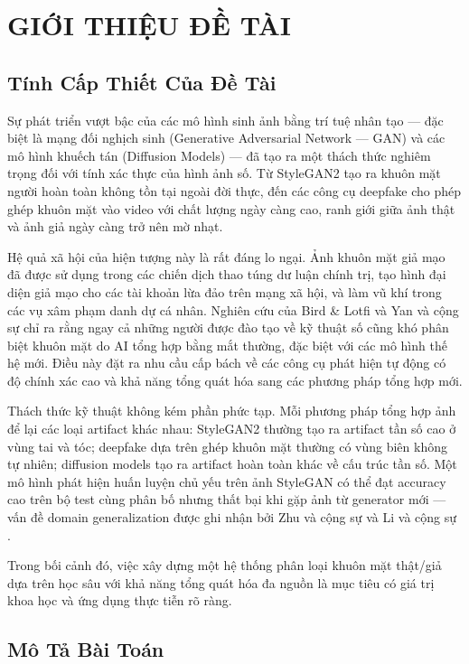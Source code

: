 \chapter{GIỚI THIỆU ĐỀ TÀI}

\section{Tính Cấp Thiết Của Đề Tài}

Sự phát triển vượt bậc của các mô hình sinh ảnh bằng trí tuệ nhân tạo --- đặc biệt là mạng đối nghịch sinh (Generative Adversarial Network --- GAN) và các mô hình khuếch tán (Diffusion Models) --- đã tạo ra một thách thức nghiêm trọng đối với tính xác thực của hình ảnh số. Từ StyleGAN2 \cite{karras2020stylegan2} tạo ra khuôn mặt người hoàn toàn không tồn tại ngoài đời thực, đến các công cụ deepfake cho phép ghép khuôn mặt vào video với chất lượng ngày càng cao, ranh giới giữa ảnh thật và ảnh giả ngày càng trở nên mờ nhạt.

Hệ quả xã hội của hiện tượng này là rất đáng lo ngại. Ảnh khuôn mặt giả mạo đã được sử dụng trong các chiến dịch thao túng dư luận chính trị, tạo hình đại diện giả mạo cho các tài khoản lừa đảo trên mạng xã hội, và làm vũ khí trong các vụ xâm phạm danh dự cá nhân. Nghiên cứu của Bird \& Lotfi \cite{bird2024cifake} và Yan và cộng sự \cite{yan2025aide} chỉ ra rằng ngay cả những người được đào tạo về kỹ thuật số cũng khó phân biệt khuôn mặt do AI tổng hợp bằng mắt thường, đặc biệt với các mô hình thế hệ mới. Điều này đặt ra nhu cầu cấp bách về các công cụ phát hiện tự động có độ chính xác cao và khả năng tổng quát hóa sang các phương pháp tổng hợp mới.

Thách thức kỹ thuật không kém phần phức tạp. Mỗi phương pháp tổng hợp ảnh để lại các loại artifact khác nhau: StyleGAN2 thường tạo ra artifact tần số cao ở vùng tai và tóc; deepfake dựa trên ghép khuôn mặt thường có vùng biên không tự nhiên; diffusion models tạo ra artifact hoàn toàn khác về cấu trúc tần số. Một mô hình phát hiện huấn luyện chủ yếu trên ảnh StyleGAN có thể đạt accuracy cao trên bộ test cùng phân bố nhưng thất bại khi gặp ảnh từ generator mới --- vấn đề domain generalization được ghi nhận bởi Zhu và cộng sự \cite{zhu2023genimage} và Li và cộng sự \cite{li2020celebdf}.

Trong bối cảnh đó, việc xây dựng một hệ thống phân loại khuôn mặt thật/giả dựa trên học sâu với khả năng tổng quát hóa đa nguồn là mục tiêu có giá trị khoa học và ứng dụng thực tiễn rõ ràng.

\section{Mô Tả Bài Toán}

